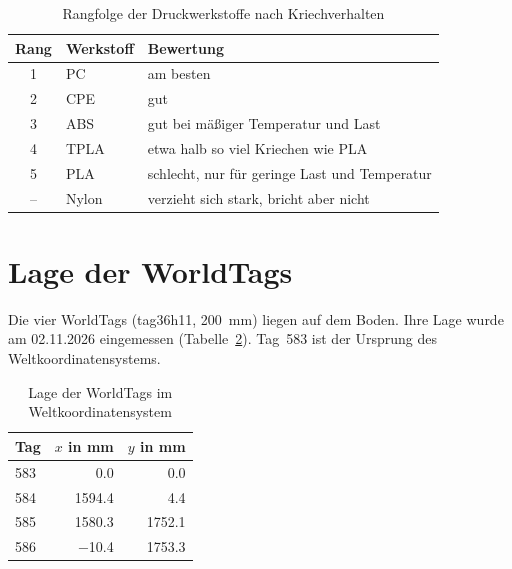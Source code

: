 \begin{table}[H]
    \centering
    \caption{Rangfolge der Druckwerkstoffe nach Kriechverhalten}
    \label{tab:mech-kriechen-rang}
    \begin{tabular}{cll}
        \toprule
        \textbf{Rang} & \textbf{Werkstoff} & \textbf{Bewertung} \\
        \midrule
        1  & PC    & am besten \\
        2  & CPE   & gut \\
        3  & ABS   & gut bei mäßiger Temperatur und Last \\
        4  & TPLA  & etwa halb so viel Kriechen wie PLA \\
        5  & PLA   & schlecht, nur für geringe Last und Temperatur \\
        -- & Nylon & verzieht sich stark, bricht aber nicht \\
        \bottomrule
    \end{tabular}
\end{table}

\section{Lage der WorldTags}
\label{app:mech-worldtags}
Die vier WorldTags (tag36h11, \SI{200}{\milli\metre}) liegen auf dem Boden. Ihre Lage wurde am 02.11.2026 eingemessen (Tabelle~\ref{tab:mech-worldtags}). Tag~583 ist der Ursprung des Weltkoordinatensystems. 

\begin{table}[H]
    \centering
    \caption{Lage der WorldTags im Weltkoordinatensystem}
    \label{tab:mech-worldtags}
    \begin{tabular}{lrr}
        \toprule
        \textbf{Tag} & \textbf{$x$ in \si{\milli\metre}} & \textbf{$y$ in \si{\milli\metre}} \\
        \midrule
        583 & \num{0,0}     & \num{0,0} \\
        584 & \num{1594,4}  & \num{4,4} \\
        585 & \num{1580,3}  & \num{1752,1} \\
        586 & \num{-10,4}   & \num{1753,3} \\
        \bottomrule
    \end{tabular}
\end{table}
